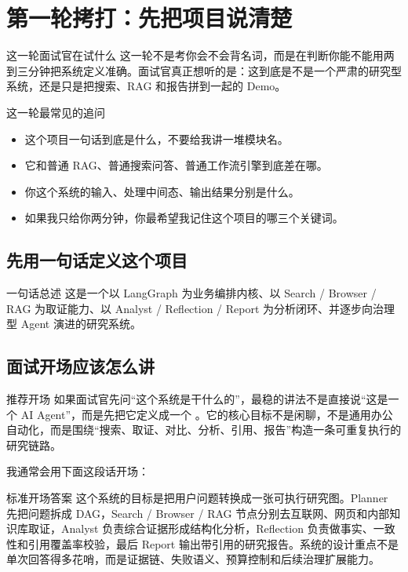 \documentclass[12pt]{article}
\begin{document}
\section{第一轮拷打：先把项目说清楚}

\begin{summaryBox}{这一轮面试官在试什么}
这一轮不是考你会不会背名词，而是在判断你能不能用两到三分钟把系统定义准确。面试官真正想听的是：这到底是不是一个严肃的研究型系统，还是只是把搜索、RAG 和报告拼到一起的 Demo。
\end{summaryBox}

\begin{qaBox}{这一轮最常见的追问}
\begin{itemize}[leftmargin=2em]
  \item 这个项目一句话到底是什么，不要给我讲一堆模块名。
  \item 它和普通 RAG、普通搜索问答、普通工作流引擎到底差在哪。
  \item 你这个系统的输入、处理中间态、输出结果分别是什么。
  \item 如果我只给你两分钟，你最希望我记住这个项目的哪三个关键词。
\end{itemize}
\end{qaBox}

\subsection{先用一句话定义这个项目}
\begin{qaBox}{一句话总述}
这是一个以 LangGraph 为业务编排内核、以 Search / Browser / RAG 为取证能力、以 Analyst / Reflection / Report 为分析闭环、并逐步向治理型 Agent 演进的研究系统。
\end{qaBox}

\subsection{面试开场应该怎么讲}
\begin{summaryBox}{推荐开场}
如果面试官先问“这个系统是干什么的”，最稳的讲法不是直接说“这是一个 AI Agent”，而是先把它定义成一个 。它的核心目标不是闲聊，不是通用办公自动化，而是围绕“搜索、取证、对比、分析、引用、报告”构造一条可重复执行的研究链路。
\end{summaryBox}

我通常会用下面这段话开场：

\begin{qaBox}{标准开场答案}
这个系统的目标是把用户问题转换成一张可执行研究图。Planner 先把问题拆成 DAG，Search / Browser / RAG 节点分别去互联网、网页和内部知识库取证，Analyst 负责综合证据形成结构化分析，Reflection 负责做事实、一致性和引用覆盖率校验，最后 Report 输出带引用的研究报告。系统的设计重点不是单次回答得多花哨，而是证据链、失败语义、预算控制和后续治理扩展能力。
\end{qaBox}
\end{document}
